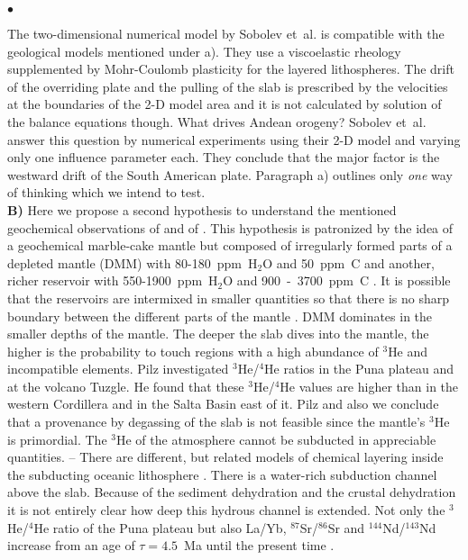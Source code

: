 \documentclass[twoside,10pt]{article}
\newenvironment{dlist}
   {\begin{list}
      {$\bullet$}
      {
      \setlength{\topsep}{0.5ex}
      \setlength{\partopsep}{0.0ex}
      \setlength{\parsep}{0.5ex}
      \setlength{\itemsep}{0.0ex}
      \setlength{\itemindent}{3.0ex}
      \setlength{\leftmargin}{0.0ex}
      \setlength{\labelsep}{1.0ex}
      }
   }
   {\end{list}}
\begin{document}
\begin{dlist}
The two-dimensional numerical model by Sobolev et~al. \cite{Sobolev2005,Sobolev2006} is compatible with the geological models mentioned under a).
They use a viscoelastic rheology supplemented by Mohr-Coulomb plasticity for the layered lithospheres. 
The drift of the overriding plate and the pulling of the slab is prescribed by the velocities at the boundaries of the 2-D model area and it is not calculated by solution of the balance equations though. 
What drives Andean orogeny? 
Sobolev et~al. \cite{Sobolev2005,Sobolev2006} answer this question by numerical experiments using their 2-D model and varying only one influence parameter each.
They conclude that the major factor is the westward drift of the South American plate. 
Paragraph a) outlines only \emph{one} way of thinking which we intend to test.\\
\textbf{B)} Here we propose a second hypothesis to understand the mentioned geochemical observations of \cite{Haschke2006} and of \cite[Fig. 5]{DeCelles2009}. 
This hypothesis is patronized by the idea of a geochemical marble-cake mantle
\cite{Walzer2008a,Walzer2011} but composed of irregularly formed parts of a depleted mantle (DMM) with \mbox{80-180 ppm H$_2$O} and \mbox{50 ppm C} and another, richer reservoir with \mbox{550-1900 ppm H$_2$O} and \mbox{900 - 3700 ppm C} \cite{Wood1995,Green1998,Wood2007}.
It is possible that the reservoirs are intermixed in smaller quantities so that there is no sharp boundary between the different parts of the mantle \cite{Hofmann2003,Stracke2005}.
DMM dominates in the smaller depths of the mantle.
The deeper the slab dives into the mantle, the higher is the probability to touch regions with a high abundance of $^{3}$He and incompatible elements.
Pilz \cite{Pilz2008} investigated  $^{3}$He/$^{4}$He ratios in the Puna plateau and at the volcano Tuzgle. He found that these $^{3}$He/$^{4}$He values are higher than in the western Cordillera and in the Salta Basin east of it.
Pilz and also we conclude that a provenance by degassing of the slab is not feasible since the mantle's $^{3}$He is primordial.
The $^{3}$He of the atmosphere cannot be subducted in appreciable quantities. -- 
There are different, but related models of chemical layering inside the subducting oceanic lithosphere \cite{Ruepke2004,Ganguly2009}.
There is a water-rich subduction channel above the slab.
Because of the sediment dehydration and the crustal dehydration it is not entirely clear how deep this hydrous channel is extended.
Not only the $^{3}$He/$^{4}$He ratio of the Puna plateau \cite{Pilz2008} but also La/Yb, $^{87}$Sr/$^{86}$Sr and $^{144}$Nd/$^{143}$Nd increase from an age of $\tau = 4.5$~Ma until the present time \cite{Haschke2006}.

\end{dlist}
\end{document}
